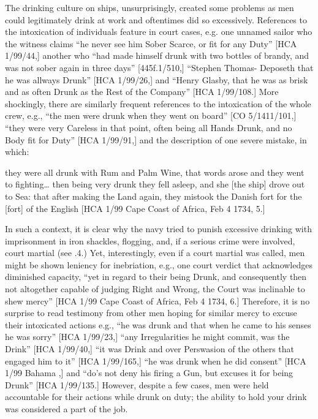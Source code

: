   The drinking culture on ships, unsurprisingly, created some problems as men could legitimately drink at work and oftentimes did so excessively. References to the intoxication of individuals feature in court cases, e.g. one unnamed sailor who the witness claims “he never see him Sober Scarce, or fit for any Duty” [HCA 1/99/44,] another who “had made himself drunk with two bottles of brandy, and was not sober again in three days” [445f.1/510,] “Stephen Thomas- Deposeth that he was allways Drunk” [HCA 1/99/26,] and “Henry Glasby, that he was as brisk and as often Drunk as the Rest of the Company” [HCA 1/99/108.] More shockingly, there are similarly frequent references to the intoxication of the whole crew, e.g., “the men were drunk when they went on board” [CO 5/1411/101,] “they were very Careless in that point, often being all Hands Drunk, and no Body fit for Duty” [HCA 1/99/91,] and the description of one severe mistake, in which: 

they were all drunk with Rum and Palm Wine, that words arose and they went to fighting… then being very drunk they fell asleep, and she [the ship] drove out to Sea: that after making the Land again, they mistook the Danish fort for the [fort] of the English [HCA 1/99 Cape Coast of Africa, Feb 4 1734, 5.]

In such a context, it is clear why the navy tried to punish excessive drinking with imprisonment in iron shackles, flogging, and, if a serious crime were involved, court martial (see .4.) Yet, interestingly, even if a court martial was called, men might be shown leniency for inebriation, e.g., one court verdict that acknowledges diminished capacity, “yet in regard to their being Drunk, and consequently then not altogether capable of judging Right and Wrong, the Court was inclinable to shew mercy” [HCA 1/99 Cape Coast of Africa, Feb 4 1734, 6.] Therefore, it is no surprise to read testimony from other men hoping for similar mercy to excuse their intoxicated actions e.g., “he was drunk and that when he came to his senses he was sorry” [HCA 1/99/23,] “any Irregularities he might commit, was the Drink” [HCA 1/99/40,] “it was Drink and over Perswasion of the others that engaged him to it” [HCA 1/99/165,] “he was drunk when he did consent” [HCA 1/99 Bahama \citealt{Islands1722},] and “do’s not deny his firing a Gun, but excuses it for being Drunk” [HCA 1/99/135.] However, despite a few cases, men were held accountable for their actions while drunk on duty; the ability to hold your drink was considered a part of the job. 

